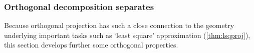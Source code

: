 






\subsubsection{Orthogonal decomposition separates}

\begin{comment}
\pooliv{p.384} does not seem to define the orthogonal space~\(\WW^\perp\).
\larsvii{p.260--8} has quick development and nice problems---defines orthogonal subspaces but probably confusing for us to do so here as only interested in orthog complement.
\nakos{pp.516--22} has straightforward development.
\end{comment}


Because orthogonal projection has such a close connection to the geometry underlying important tasks such as `least square' approximation (\cref{thm:lsqproj}), this section develops further some orthogonal properties.

